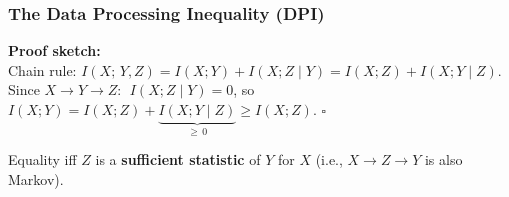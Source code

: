 \documentclass[aspectratio=169]{beamer}
\begin{document}
\begin{frame}
\frametitle{The Data Processing Inequality (DPI)}

\begin{center}
\end{center}

\pause
\vspace{0.1cm}
\textbf{Proof sketch:}\\[2pt]
\small
Chain rule: $I(X;\, Y, Z) = I(X; Y) + I(X; Z \mid Y) = I(X; Z) + I(X; Y \mid Z)$.\\[2pt]
Since $X \to Y \to Z$: $\;I(X; Z \mid Y) = 0$, so $I(X; Y) = I(X; Z) + \underbrace{I(X; Y \mid Z)}_{\geq\, 0} \geq I(X; Z)$. \;$\square$

\vspace{0.05cm}
\begin{center}
\small Equality iff $Z$ is a \textbf{sufficient statistic} of $Y$ for $X$ (i.e., $X \to Z \to Y$ is also Markov).
\end{center}
\end{frame}
\end{document}
